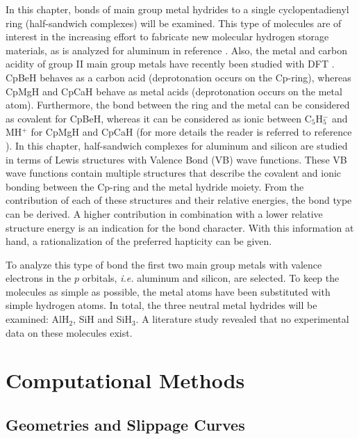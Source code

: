 In this chapter, bonds of main group metal hydrides to a single cyclopentadienyl ring (half-sandwich complexes) will be examined. This type of molecules are of interest in the increasing effort to fabricate new molecular hydrogen storage materials, as is analyzed for aluminum in reference \cite{himmel}. Also, the metal and carbon acidity of group II main group metals have recently been studied with DFT \cite{hurtado}. CpBeH behaves as a carbon acid (deprotonation occurs on the Cp-ring), whereas CpMgH and CpCaH behave as metal acids (deprotonation occurs on the metal atom). Furthermore, the bond between the ring and the metal can be considered as covalent for CpBeH, whereas it can be considered as ionic between C$_5$H$_5^{-}$ and MH$^{+}$ for CpMgH and CpCaH (for more details the reader is referred to reference \cite{hurtado}). In this chapter, half-sandwich complexes for aluminum and silicon are studied in terms of Lewis structures with Valence Bond (VB) wave functions. These VB wave functions contain multiple structures that describe the covalent and ionic bonding between the Cp-ring and the metal hydride moiety. From the contribution of each of these structures and their relative energies, the bond type can be derived. A higher contribution in combination with a lower relative structure energy is an indication for the bond character. With this information at hand, a rationalization of the preferred hapticity can be given. 

To analyze this type of bond the first two main group metals with valence electrons in the $p$ orbitals, \textit{i.e.} aluminum and silicon, are selected. To keep the molecules as simple as possible, the metal atoms have been substituted with simple hydrogen atoms. In total, the three neutral metal hydrides will be examined: AlH$_2$, SiH and SiH$_3$. A literature study revealed that no experimental data on these molecules exist.

\section{Computational Methods}

\subsection{\label{ch4.sec.geom}Geometries and Slippage Curves}


